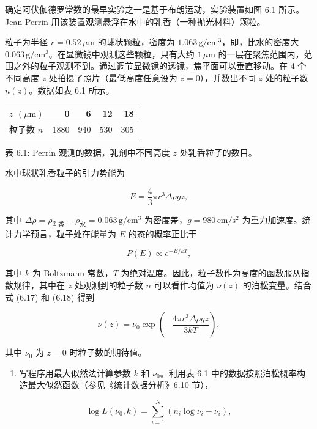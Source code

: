 \begin{question}
确定阿伏伽德罗常数的最早实验之一是基于布朗运动，实验装置如图 6.1
所示。Jean Perrin 用该装置观测悬浮在水中的乳香（一种抛光材料）颗粒。


粒子为半径 \(r=0.52\,\mu\mathrm{m}\) 的球状颗粒，密度为
\(1.063\,\mathrm{g/cm^3}\)，即，比水的密度大
\(0.063\,\mathrm{g/cm^3}\)。在显微镜中观测这些颗粒，只有大约
\(1\,\mu\mathrm{m}\)
的一层在聚焦范围内，范围之外的粒子观测不到。通过调节显微镜的透镜，焦平面可以垂直移动。在
4 个不同高度 \(z\) 处拍摄了照片（最低高度任意设为 \(z=0\)），并数出不同
\(z\) 处的粒子数 \(n(z)\)。数据如表 6.1 所示。

{%
\begin{longtable}[]{@{}lrrrr@{}}
\toprule\noalign{}
\(z\) \((\mu\mathrm{m})\) & 0 & 6 & 12 & 18 \\
\midrule\noalign{}
\endhead
\bottomrule\noalign{}
\endlastfoot
粒子数 \(n\) & 1880 & 940 & 530 & 305 \\
\end{longtable}
}

表 6.1: Perrin 观测的数据，乳剂中不同高度 \(z\) 处乳香粒子的数目。

水中球状乳香粒子的引力势能为

\[
E=\frac43\pi r^3\Delta\rho gz,
\]

其中 \(\Delta\rho=\rho_{\text{乳香}}-\rho_{\text{水}}=0.063\,\mathrm{g/cm^3}\)
为密度差，\(g=980\,\mathrm{cm/s^2}\)
为重力加速度。统计力学预言，粒子处在能量为 \(E\) 的态的概率正比于

\[
P(E)\propto e^{-E/kT},
\]

其中 \(k\) 为 Boltzmann 常数，\(T\)
为绝对温度。因此，粒子数作为高度的函数服从指数规律，其中在 \(z\)
处观测到的粒子数 \(n\) 可以看作均值为 \(\nu(z)\) 的泊松变量。结合式
(6.17) 和 (6.18) 得到

\[
\nu(z)=\nu_0\exp\left(-\frac{4\pi r^3\Delta\rho gz}{3kT}\right),
\]

其中 \(\nu_0\) 为 \(z=0\) 时粒子数的期待值。

\begin{enumerate}
\item
  写程序用最大似然法计算参数 \(k\) 和 \(\nu_0\)。利用表 6.1
  中的数据按照泊松概率构造最大似然函数（参见《统计数据分析》6.10 节），
\end{enumerate}

\[
\log L(\nu_0,k)=\sum_{i=1}^{N}(n_i\log\nu_i-\nu_i),
\]


\end{question}
